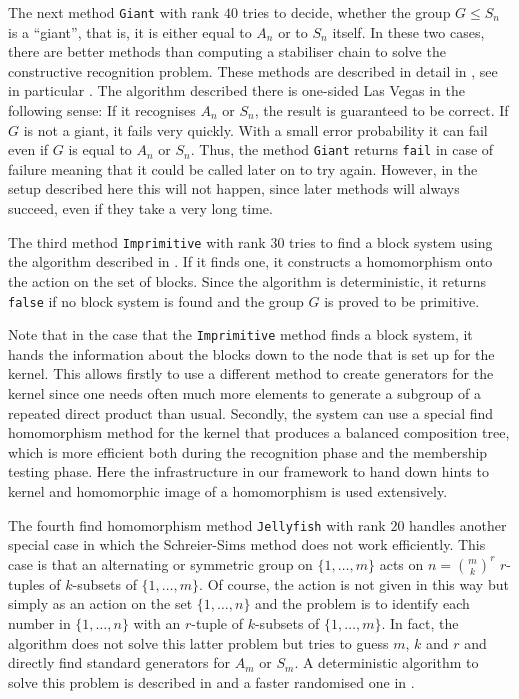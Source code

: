 The next method \texttt{Giant} with rank $40$ tries to decide, whether the
group $G \le S_n$ is a ``giant'', that is, it is either equal to
$A_n$ or to $S_n$ itself. In these two cases, there are better methods than
computing a stabiliser chain to solve the constructive recognition problem.
These methods are described in detail in \cite[Section~10.2]{Ser}, see
in particular \cite[Section~10.2.4]{Ser}. The algorithm described there
is one-sided Las Vegas in the following sense:  If it recognises $A_n$ or
$S_n$, the result is guaranteed to be correct. If $G$ is not a giant, it
fails very quickly. With a small error probability it can fail even if
$G$ is equal to $A_n$ or $S_n$. Thus, the method \texttt{Giant} returns
\texttt{fail} in case of failure meaning that it could be called later
on to try again. However, in the setup described here this will not
happen, since later methods will always succeed, even if they take a
very long time.

The third method \texttt{Imprimitive} with rank $30$ tries to find a block
system using the algorithm described in \cite[Section~5.5.1]{Ser}. If it 
finds one, it constructs a homomorphism onto the action on the set of
blocks. Since the algorithm is deterministic, it returns \texttt{false}
if no block system is found and the group $G$ is proved to be primitive.

Note that in the case that the \texttt{Imprimitive} method finds a block
system, it hands the information about the blocks down to the node that is
set up for the kernel. This allows firstly to use a different method to
create generators for the kernel since one needs often much more elements
to generate a subgroup of a repeated direct product than usual. Secondly,
the system can use a special find homomorphism
method for the kernel that produces a balanced composition tree, which 
%
is more efficient both during the recognition phase and the membership
testing phase. Here the infrastructure in our framework to hand down 
hints to kernel and homomorphic image of a homomorphism is used 
%
extensively.
\enlargethispage{1\baselineskip}

The fourth find homomorphism method \texttt{Jellyfish} with rank $20$
handles another special case in which the Schreier-Sims method does
not work efficiently. This case is that an alternating or symmetric
group on $\{1,\ldots,m\}$ acts on $n = {m \choose k}^r$ $r$-tuples
of $k$-subsets of $\{1,\ldots,m\}$. Of course, the action is not
given in this way but simply as an action on the set $\{1,\ldots,n\}$
and the problem is to identify each number in $\{1,\ldots,n\}$ with
an $r$-tuple of $k$-subsets of $\{ 1, \ldots, m\}$. In fact, the
algorithm does not solve this latter problem but tries to guess
$m$, $k$ and $r$ and directly find standard generators for $A_m$ or
$S_m$. A deterministic algorithm to solve this problem is described
in \cite[Section~4]{fastmanag} and a faster randomised one in
\cite{Jellyfish}.

